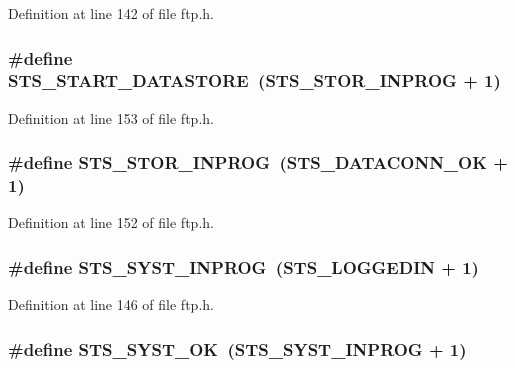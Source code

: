 Definition at line 142 of file ftp.h.

\hypertarget{group__ftp_ga731fe84d2369ca6d827155e2ea9ccd37}{
\subsubsection[{STS\_\-START\_\-DATASTORE}]{\setlength{\rightskip}{0pt plus 5cm}\#define STS\_\-START\_\-DATASTORE~(STS\_\-STOR\_\-INPROG + 1)}}
\label{group__ftp_ga731fe84d2369ca6d827155e2ea9ccd37}


Definition at line 153 of file ftp.h.

\hypertarget{group__ftp_ga66de4fa6c61ea9f3b365df7caf0e0dd5}{
\subsubsection[{STS\_\-STOR\_\-INPROG}]{\setlength{\rightskip}{0pt plus 5cm}\#define STS\_\-STOR\_\-INPROG~(STS\_\-DATACONN\_\-OK + 1)}}
\label{group__ftp_ga66de4fa6c61ea9f3b365df7caf0e0dd5}


Definition at line 152 of file ftp.h.

\hypertarget{group__ftp_ga722775804a5d9b7284483035d2bd7f60}{
\subsubsection[{STS\_\-SYST\_\-INPROG}]{\setlength{\rightskip}{0pt plus 5cm}\#define STS\_\-SYST\_\-INPROG~(STS\_\-LOGGEDIN + 1)}}
\label{group__ftp_ga722775804a5d9b7284483035d2bd7f60}


Definition at line 146 of file ftp.h.

\hypertarget{group__ftp_ga8ad7d921fb5f219e862fea273dd44200}{
\subsubsection[{STS\_\-SYST\_\-OK}]{\setlength{\rightskip}{0pt plus 5cm}\#define STS\_\-SYST\_\-OK~(STS\_\-SYST\_\-INPROG + 1)}}
\label{group__ftp_ga8ad7d921fb5f219e862fea273dd44200}



